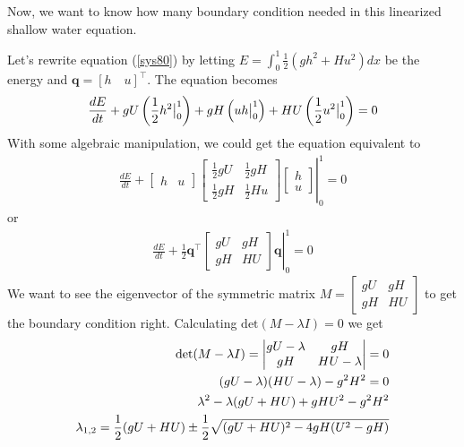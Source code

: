 \documentclass{article}
\newcommand{\half}{\frac{1}{2}}
\theoremstyle{definition}
\begin{document}
    Now, we want to know how many boundary condition needed in this 
    linearized shallow water equation. 

    Let's rewrite equation (\ref{sys80}) by letting $E= \int_0^1 \half \left(gh^2 + Hu^2 \right) dx $ be the energy and 
    $\mathbf{q} = [h \quad u]^\top $. 
    The equation becomes
    \begin{align}
        \label{energyestimates-h-gH-u}
        \frac{dE}{dt} 
        + gU \left( \half h^2 \big\vert_0^1 \right)
        + gH \left( uh\big{\vert}_0^1 \right)
        + HU \left( \half u^2 \big\vert_0^1 \right) = 0
    \end{align}
    With some algebraic manipulation, we could get the equation equivalent to
    \begin{align}
        \frac{d{E}}{dt} + \left.
        \begin{bmatrix}h & u
        \end{bmatrix}
        \begin{bmatrix}
            \half gU & \half gH \\
            \half gH & \half Hu 
        \end{bmatrix}
        \begin{bmatrix}
            h \\ u
        \end{bmatrix}\right\vert_0^1 =0 
    \end{align}
    or 
    \begin{align} \label{qtAq_1}
        \frac{d{E}}{dt} + \left. \half
        \mathbf{q}^\top 
        \begin{bmatrix}
             gU &  gH \\
             gH &  HU 
        \end{bmatrix}\mathbf{q}\right\vert_0^1 = 0
    \end{align}
    We want to see the eigenvector of the symmetric matrix
    $M=\begin{bmatrix}gU&gH\\gH&HU\end{bmatrix}$ to get the boundary condition right. 
    Calculating $\text{det}(M-\lambda I)=0$ we get 
    \begin{align}
        \text{det}(M-\lambda I) = \left\vert 
            \begin{matrix}
            gU - \lambda & gH \\ gH & HU-\lambda
            \end{matrix}
        \right\vert  = 0 \notag \\
        (gU-\lambda)(HU - \lambda) - g^2H^2 = 0 \notag \\
        \lambda^2 - \lambda(gU+HU) + gHU^2 - g^2H^2 \notag \\
        \lambda_{1,2} = \half{(gU+HU) \pm \half \sqrt{(gU+HU)^2 - 4gH(U^2 - gH)}}
    \end{align}
\end{document}
